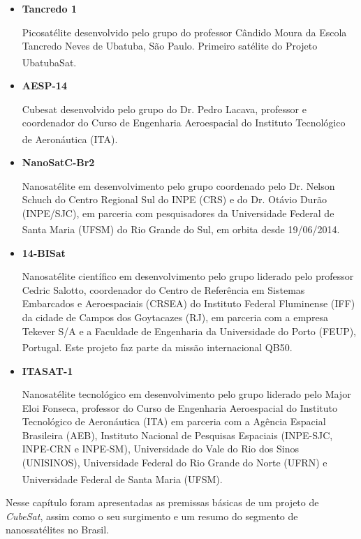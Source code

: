 \documentclass[
	12pt,				%
	openright,			%
	oneside,			%
	a4paper,			%
	english,			%
	french,				%
	spanish,			%
	brazil,				%
	oldfontcommands
	]{abntex2}
\begin{document}
	\begin{itemize}
		\item \textbf{Tancredo 1}
		
			Picosatélite desenvolvido pelo grupo do professor Cândido Moura da Escola Tancredo Neves de Ubatuba, São Paulo. Primeiro satélite do Projeto UbatubaSat.\textsuperscript{\cite{UbatubaSat}}
			
		\item \textbf{AESP-14}		
		
			Cubesat desenvolvido pelo grupo do Dr. Pedro Lacava, professor e coordenador do Curso de Engenharia Aeroespacial do Instituto Tecnológico de Aeronáutica (ITA).\textsuperscript{\cite{AESP14}}
			
		\item \textbf{NanoSatC-Br2}
		
			Nanosatélite em desenvolvimento pelo grupo coordenado pelo Dr. Nelson Schuch do Centro Regional Sul do INPE (CRS) e do Dr. Otávio Durão (INPE/SJC), em parceria com pesquisadores da Universidade Federal de Santa Maria (UFSM) do Rio Grande do Sul, em orbita desde 19/06/2014.\textsuperscript{\cite{INPE}}

		\item \textbf{14-BISat}

			Nanosatélite científico em desenvolvimento pelo grupo liderado pelo professor Cedric Salotto, coordenador do Centro de Referência em Sistemas Embarcados e Aeroespaciais (CRSEA) do Instituto Federal Fluminense (IFF) da cidade de Campos dos Goytacazes (RJ), em parceria com a empresa Tekever S/A e a Faculdade de Engenharia da Universidade do Porto (FEUP), Portugal. Este projeto faz parte da missão internacional QB50.\textsuperscript{\cite{IFF}}
			
		\item \textbf{ITASAT-1}	

			Nanosatélite tecnológico em desenvolvimento pelo grupo liderado pelo Major Eloi Fonseca, professor do Curso de Engenharia Aeroespacial do Instituto Tecnológico de Aeronáutica (ITA) em parceria com a Agência Espacial Brasileira (AEB), Instituto Nacional de Pesquisas Espaciais (INPE-SJC, INPE-CRN e INPE-SM), Universidade do Vale do Rio dos Sinos (UNISINOS), Universidade Federal do Rio Grande do Norte (UFRN) e Universidade Federal de Santa Maria (UFSM).\textsuperscript{\cite{ITASAT}}	
			
	\end{itemize}

	Nesse capítulo foram apresentadas as premissas básicas de um projeto de \textit{CubeSat}, assim como o seu surgimento e  um resumo do segmento de nanossatélites no Brasil.
\end{document}
